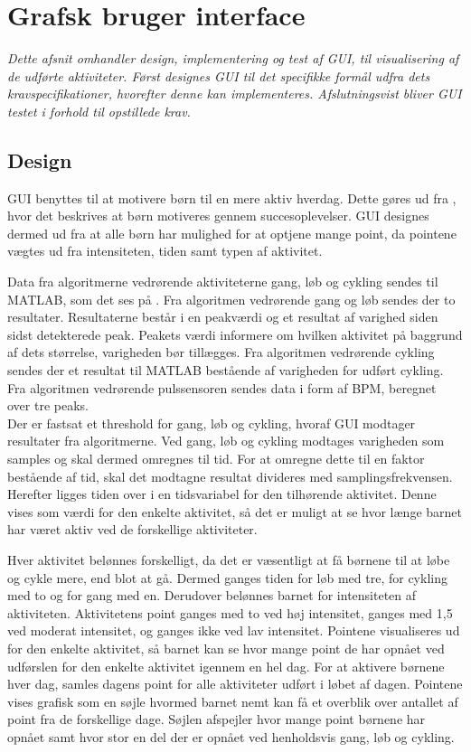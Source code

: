 \section{Grafsk bruger interface}
\textit{Dette afsnit omhandler design, implementering og test af GUI, til visualisering af de udførte aktiviteter. Først designes GUI til det specifikke formål udfra dets kravspecifikationer, hvorefter denne kan implementeres. Afslutningsvist bliver GUI testet i forhold til opstillede krav.}
\subsection{Design}
GUI benyttes til at motivere børn til en mere aktiv hverdag. Dette gøres ud fra , hvor det beskrives at børn motiveres gennem succesoplevelser. GUI designes dermed ud fra at alle børn har mulighed for at optjene mange point, da pointene vægtes ud fra intensiteten, tiden samt typen af aktivitet.

Data fra algoritmerne vedrørende aktiviteterne gang, løb og cykling sendes til MATLAB, som det ses på . Fra algoritmen vedrørende gang og løb sendes der to resultater. Resultaterne består i en peakværdi og et resultat af varighed siden sidst detekterede peak. Peakets værdi informere om hvilken aktivitet på baggrund af dets størrelse, varigheden bør tillægges. Fra algoritmen vedrørende cykling sendes der et resultat til MATLAB bestående af varigheden for udført cykling. Fra algoritmen vedrørende pulssensoren sendes data i form af BPM, beregnet over tre peaks. \\
Der er fastsat et threshold for gang, løb og cykling, hvoraf GUI modtager resultater fra algoritmerne. Ved gang, løb og cykling modtages varigheden som samples og skal dermed omregnes til tid. For at omregne dette til en faktor bestående af tid, skal det modtagne resultat divideres med samplingsfrekvensen. Herefter ligges tiden over i en tidsvariabel for den tilhørende aktivitet. Denne vises som værdi for den enkelte aktivitet, så det er muligt at se hvor længe barnet har været aktiv ved de forskellige aktiviteter.

Hver aktivitet belønnes forskelligt, da det er væsentligt at få børnene til at løbe og cykle mere, end blot at gå. Dermed ganges tiden for løb med tre, for cykling med to og for gang med en. Derudover belønnes barnet for intensiteten af aktiviteten. Aktivitetens point ganges med to ved høj intensitet, ganges med 1,5 ved moderat intensitet, og ganges ikke ved lav intensitet. Pointene visualiseres ud for den enkelte aktivitet, så barnet kan se hvor mange point de har opnået ved udførslen for den enkelte aktivitet igennem en hel dag. For at aktivere børnene hver dag, samles dagens point for alle aktiviteter udført i løbet af dagen. Pointene vises grafisk som en søjle hvormed barnet nemt kan få et overblik over antallet af point fra de forskellige dage. Søjlen afspejler hvor mange point børnene har opnået samt hvor stor en del der er opnået ved henholdsvis gang, løb og cykling.  

